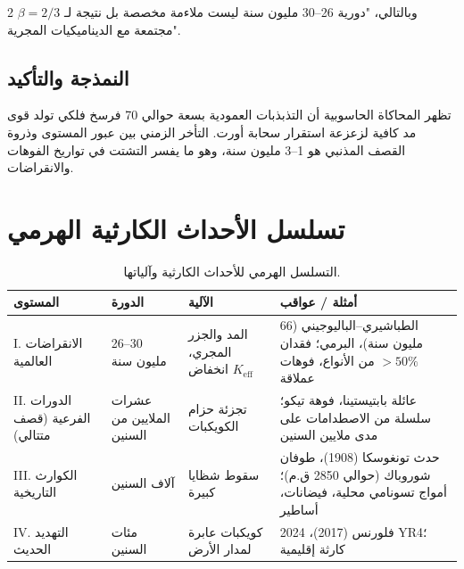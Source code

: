 \documentclass[11pt,a4paper]{article}
\begin{document}
\begin{multicols}{2}
		وبالتالي، "دورية 26–30 مليون سنة ليست ملاءمة مخصصة بل نتيجة لـ \(\beta = 2/3\) مجتمعة مع الديناميكيات المجرية".
		
		\subsection{النمذجة والتأكيد}
		تظهر المحاكاة الحاسوبية \cite{RampinoCaldeira2015, MateseWhitmire2011} أن التذبذبات العمودية بسعة حوالي 70 فرسخ فلكي تولد قوى مد كافية لزعزعة استقرار سحابة أورت. التأخر الزمني بين عبور المستوى وذروة القصف المذنبي هو 1–3 مليون سنة، وهو ما يفسر التشتت في تواريخ الفوهات والانقراضات.
		
	\end{multicols}
	
	\section{تسلسل الأحداث الكارثية الهرمي}
	\begin{table}[!ht]
		\centering
		\caption{التسلسل الهرمي للأحداث الكارثية وآلياتها.}
		\label{tab:hierarchy}
		\scriptsize
		\begin{tabular}{p{3.5cm}p{2.4cm}p{3.4cm}p{7.5cm}}
			\toprule
			\textbf{المستوى} & \textbf{الدورة} & \textbf{الآلية} & \textbf{أمثلة / عواقب} \\
			\midrule
			I. الانقراضات العالمية & 26–30 مليون سنة & المد والجزر المجري، انخفاض \(K_{\mathrm{eff}}\) & الطباشيري–الباليوجيني (66 مليون سنة)، البرمي؛ فقدان \(>50\%\) من الأنواع، فوهات عملاقة \\
			II. الدورات الفرعية (قصف متتالي) & عشرات الملايين من السنين & تجزئة حزام الكويكبات & عائلة بابتيستينا، فوهة تيكو؛ سلسلة من الاصطدامات على مدى ملايين السنين \\
			III. الكوارث التاريخية & آلاف السنين & سقوط شظايا كبيرة & حدث تونغوسكا (1908)، طوفان شوروباك (حوالي 2850 ق.م)؛ أمواج تسونامي محلية، فيضانات، أساطير \\
			IV. التهديد الحديث & مئات السنين & كويكبات عابرة لمدار الأرض & فلورنس (2017)، 2024 YR4؛ كارثة إقليمية \\
			\bottomrule
		\end{tabular}
	\end{table}
	
\end{document}
